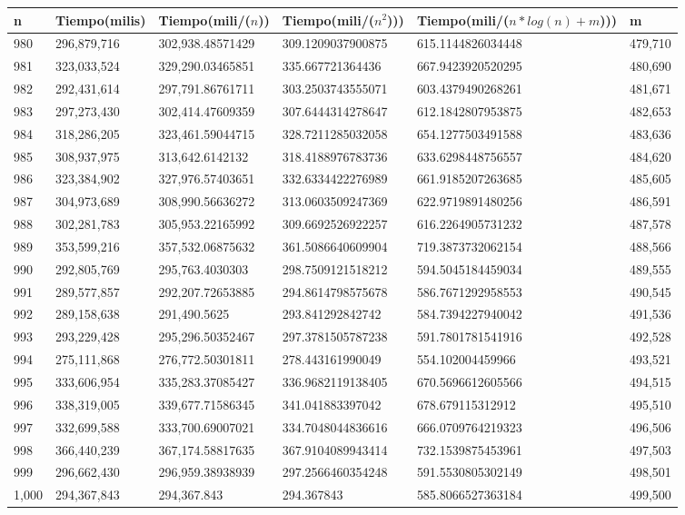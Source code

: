 \begin{table}[H]
\parbox{0.3\textwidth}{
    \begin{tabular}{ | l | l | l | l | l | l |}
    \hline
n   &Tiempo(milis) &Tiempo(mili/($n$)) &Tiempo(mili/($n^2$))) &Tiempo(mili/($n*log(n) + m$))) &m\\ \hline
980	&296,879,716	&302,938.48571429	&309.1209037900875	&615.1144826034448	&479,710\\ \hline
981	&323,033,524	&329,290.03465851	&335.667721364436	&667.9423920520295	&480,690\\ \hline
982	&292,431,614	&297,791.86761711	&303.2503743555071	&603.4379490268261	&481,671\\ \hline
983	&297,273,430	&302,414.47609359	&307.6444314278647	&612.1842807953875	&482,653\\ \hline
984	&318,286,205	&323,461.59044715	&328.7211285032058	&654.1277503491588	&483,636\\ \hline
985	&308,937,975	&313,642.6142132	&318.4188976783736	&633.6298448756557	&484,620\\ \hline
986	&323,384,902	&327,976.57403651	&332.6334422276989	&661.9185207263685	&485,605\\ \hline
987	&304,973,689	&308,990.56636272	&313.0603509247369	&622.9719891480256	&486,591\\ \hline
988	&302,281,783	&305,953.22165992	&309.6692526922257	&616.2264905731232	&487,578\\ \hline
989	&353,599,216	&357,532.06875632	&361.5086640609904	&719.3873732062154	&488,566\\ \hline
990	&292,805,769	&295,763.4030303	&298.7509121518212	&594.5045184459034	&489,555\\ \hline
991	&289,577,857	&292,207.72653885	&294.8614798575678	&586.7671292958553	&490,545\\ \hline
992	&289,158,638	&291,490.5625	    &293.841292842742	&584.7394227940042	&491,536\\ \hline
993	&293,229,428	&295,296.50352467	&297.3781505787238	&591.7801781541916	&492,528\\ \hline
994	&275,111,868	&276,772.50301811	&278.443161990049	&554.102004459966	&493,521\\ \hline
995	&333,606,954	&335,283.37085427	&336.9682119138405	&670.5696612605566	&494,515\\ \hline
996	&338,319,005	&339,677.71586345	&341.041883397042	&678.679115312912	&495,510\\ \hline
997	&332,699,588	&333,700.69007021	&334.7048044836616	&666.0709764219323	&496,506\\ \hline
998	&366,440,239	&367,174.58817635	&367.9104089943414	&732.1539875453961	&497,503\\ \hline
999	&296,662,430	&296,959.38938939	&297.2566460354248	&591.5530805302149	&498,501\\ \hline
1,000	&294,367,843	&294,367.843    &294.367843         &585.8066527363184  &499,500\\ \hline
    \end{tabular}
}
\end{table}

